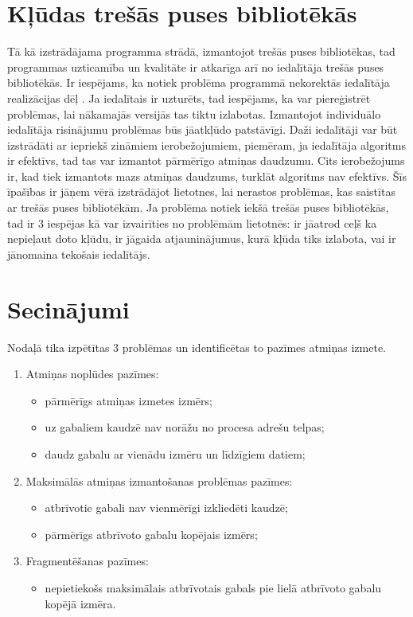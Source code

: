 \section{Kļūdas trešās puses bibliotēkās}
Tā kā izstrādājama programma strādā, izmantojot trešās puses bibliotēkas, tad programmas uzticamība un kvalitāte ir atkarīga arī no iedalītāja trešās puses bibliotēkās.
Ir iespējams, ka notiek problēma programmā nekorektās iedalītāja realizācijas dēļ \cite{MUE}.
Ja iedalītais ir uzturēts, tad iespējams, ka var piereģistrēt problēmas, lai nākamajās versijās tas tiktu izlabotas.
Izmantojot individuālo iedalītāja risinājumu problēmas būs jāatkļūdo patstāvīgi.  
Daži iedalītāji var būt izstrādāti ar iepriekš zināmiem ierobežojumiem, piemēram, ja iedalītāja algoritms ir efektīvs, tad tas var izmantot pārmērīgo atmiņas daudzumu.
Cits ierobežojums ir, kad tiek izmantots mazs atmiņas daudzums, turklāt algoritms nav efektīvs.
Šīs īpašības ir jāņem vērā izstrādājot lietotnes, lai nerastos problēmas, kas saistītas ar trešās puses bibliotēkām.
Ja problēma notiek iekšā trešās puses bibliotēkās, tad ir 3 iespējas kā var izvairīties no problēmām lietotnēs: ir jāatrod ceļš ka nepieļaut doto kļūdu, ir jāgaida atjauninājumus, kurā kļūda tiks izlabota, vai ir jānomaina tekošais iedalītājs. 


\section{Secinājumi}
Nodaļā tika izpētītas 3 problēmas un identificētas to pazīmes atmiņas izmete.
\begin{enumerate}
\item Atmiņas noplūdes pazīmes:
    \begin{itemize} \itemsep5pt \parskip5pt 
        \item pārmērīgs atmiņas izmetes izmērs;
        \item uz gabaliem kaudzē nav norāžu no procesa adrešu telpas;
        \item daudz gabalu ar vienādu izmēru un līdzīgiem datiem;
    \end{itemize}
\item Maksimālās atmiņas izmantošanas problēmas pazīmes:
    \begin{itemize} \itemsep5pt \parskip5pt 
        \item atbrīvotie gabali nav vienmērīgi izkliedēti kaudzē;
        \item pārmērīgs atbrīvoto gabalu kopējais izmērs;
    \end{itemize}
 \item Fragmentēšanas pazīmes:
    \begin{itemize} \itemsep5pt \parskip5pt 
        \item nepietiekošs maksimālais atbrīvotais gabals pie lielā atbrīvoto gabalu kopējā izmēra.
    \end{itemize}
\end{enumerate}



